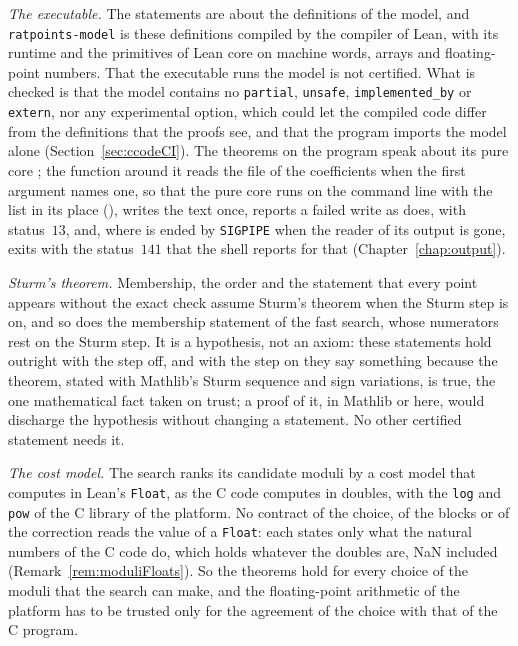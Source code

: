 \emph{The executable.} The statements are about the definitions of the model, and
\verb|ratpoints-model| is these definitions compiled by the compiler of Lean, with its runtime and
the primitives of Lean core on machine words, arrays and floating-point numbers. That the executable
runs the model is not certified. What is checked is that the model contains no \verb|partial|,
\verb|unsafe|, \verb|implemented_by| or \verb|extern|, nor any experimental option, which could let
the compiled code differ from the definitions that the proofs see, and that the program imports the
model alone (Section~\ref{sec:ccodeCI}). The theorems on the program speak about its pure core
; the function  around it reads the file of the
coefficients when the first argument names one, so that the pure core runs on the command line with
the list in its place (), writes the text once, reports a failed
write as \ratpoints{} does, with status~$13$, and, where \ratpoints{} is ended by \verb|SIGPIPE|
when the reader of its output is gone, exits with the status~$141$ that the shell reports for that
(Chapter~\ref{chap:output}).

\emph{Sturm's theorem.} Membership, the order and the statement that every point appears without
the exact check assume Sturm's theorem when the Sturm step is on, and so does the membership
statement of the fast search, whose numerators rest on the Sturm step. It is a hypothesis, not an axiom:
these statements hold outright with the step off, and with the step on they say something because
the theorem, stated with Mathlib's Sturm sequence and sign variations, is true, the one mathematical
fact taken on trust; a proof of it, in Mathlib or here, would discharge the hypothesis without
changing a statement. No other certified statement needs it.

\emph{The cost model.} The search ranks its candidate moduli by a cost model that computes in
Lean's \verb|Float|, as the C code computes in doubles, with the \verb|log| and \verb|pow| of the
C library of the platform. No contract of the choice, of the blocks or of the correction reads the
value of a \verb|Float|: each states only what the natural numbers of the C code do, which holds
whatever the doubles are, NaN included (Remark~\ref{rem:moduliFloats}). So the theorems hold for
every choice of the moduli that the search can make, and the floating-point arithmetic of the
platform has to be trusted only for the agreement of the choice with that of the C program.

